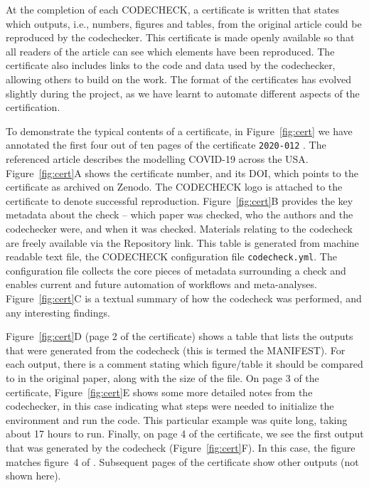 \documentclass[12pt]{article}
\begin{document}
At the completion of each CODECHECK, a certificate is written that
states which outputs, i.e., numbers, figures and tables, from the 
original article could be reproduced by the codechecker.
This certificate is made openly
available so that all readers of the article can see which elements
have been reproduced.  The certificate also includes links to the code
and data used by the codechecker, allowing others to build on the
work.
The format of the certificates has evolved slightly during the
project, as we have learnt to automate different aspects of the
certification.  

To demonstrate the typical contents of a certificate, in
Figure~\ref{fig:cert} we have annotated the first four out of ten
pages of the certificate \texttt{2020-012} \cite{cert-2020-012}.
The referenced article \cite{Unwin2020} describes the modelling COVID-19
across the USA.
Figure~\ref{fig:cert}A shows the certificate number, and its DOI,
which points to the certificate as archived on Zenodo.
The CODECHECK logo is
attached to the certificate to denote successful reproduction.
Figure~\ref{fig:cert}B provides the key metadata about the check --
which paper was checked, who the authors and the codechecker were,
and when it was checked. Materials
relating to the codecheck are freely available via the Repository
link. This table is generated from machine readable text file, the
CODECHECK configuration file \texttt{codecheck.yml}.
The configuration file collects the core pieces of metadata surrounding
a check and enables current and future automation of workflows and 
meta-analyses.
Figure~\ref{fig:cert}C is a textual summary of how the codecheck was
performed, and any interesting findings.

Figure~\ref{fig:cert}D (page 2 of the certificate) shows a table that
lists the outputs that were generated from the codecheck (this is
termed the MANIFEST).  For each output, there is a comment stating
which figure/table it should be compared to in the original paper,
along with the size of the file.  On page 3 of the certificate,
Figure~\ref{fig:cert}E shows some more detailed notes from the
codechecker, in this case indicating what steps were needed to
initialize the environment and run the code.  This particular example
was quite long, taking about 17 hours to run.  Finally, on page 4 of
the certificate, we see the first output that was generated by the
codecheck (Figure~\ref{fig:cert}F).  In this case, the figure matches
figure~4 of \cite{Unwin2020}.  Subsequent pages of the certificate show other
outputs (not shown here).
\end{document}

